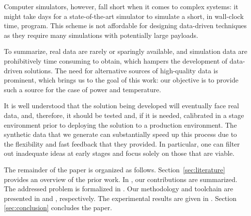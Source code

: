 Computer simulators, however, fall short when it comes to complex systems: it
might take days for a state-of-the-art simulator to simulate a short, in
wall-clock time, program. This scheme is not affordable for designing
data-driven techniques as they require many simulations with potentially large
payloads.

To summarize, real data are rarely or sparingly available, and simulation data
are prohibitively time consuming to obtain, which hampers the development of
data-driven solutions. The need for alternative sources of high-quality data is
prominent, which brings us to the goal of this work: our objective is to provide
such a source for the case of power and temperature.

It is well understood that the solution being developed will eventually face
real data, and, therefore, it should be tested and, if it is needed, calibrated
in a stage environment prior to deploying the solution to a production
environment. The synthetic data that we generate can substantially speed up this
process due to the flexibility and fast feedback that they provided. In
particular, one can filter out inadequate ideas at early stages and focus solely
on those that are viable.

The remainder of the paper is organized as follows. Section~\ref{sec:literature}
provides an overview of the prior work. In , our
contributions are summarized. The addressed problem is formalized in
. Our methodology and toolchain are presented in
 and , respectively. The experimental results
are given in . Section \ref{sec:conclusion} concludes the paper.
